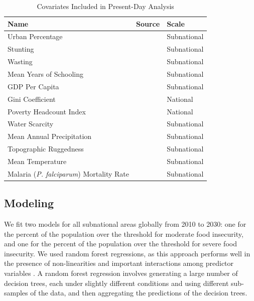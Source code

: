 \documentclass{article}
\begin{document}
\begin{table}[H]
  \centering
	\begin{tabular}{lll}
		\toprule
    Name & Source & Scale \\
		\midrule
    Urban Percentage & \citep{Jones2016} & Subnational \\
    Stunting & \citep{Local2020} & Subnational \\
    Wasting & \citep{Local2020} & Subnational \\
    Mean Years of Schooling & \citep{Smits2019, KC2017} & Subnational\\
    GDP Per Capita & \citep{Smits2019, Dellink2017} & Subnational \\
    Gini Coefficient & \citep{Rao2019a} & National\\
    Poverty Headcount Index & \citep{Cuaresma2018} & National \\
    Water Scarcity & \citep{greve2018global} & Subnational \\
    Mean Annual Precipitation &  \cite{abatzoglou2018terraclimate, warszawski2014inter} & Subnational \\
    Topographic Ruggedness &  \cite{USGS1996, Riley1999} & Subnational \\
    Mean Temperature &  \cite{abatzoglou2018terraclimate, warszawski2014inter} & Subnational \\
    Malaria (\textit{P. falciparum}) Mortality Rate &  \cite{Weiss2019} & Subnational \\
		\bottomrule
	\end{tabular}
	\caption{Covariates Included in Present-Day Analysis}
	\label{tab:covars}
\end{table}


\subsection{Modeling}
We fit two models for all subnational areas globally from 2010 to 2030: one for the percent of the population over the threshold for moderate food insecurity, and one for the percent of the population over the threshold for severe food insecurity.  We used random forest regressions, as this approach performs well in the presence of non-linearities and important interactions among predictor variables \citep{hastie2009elements}.  A random forest regression involves generating a large number of decision trees, each under slightly different conditions and using different sub-samples of the data, and then aggregating the predictions of the decision trees.
\end{document}
